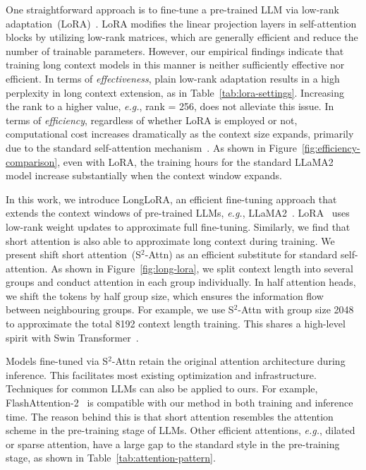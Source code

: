 \documentclass{article} %
\begin{document}
One straightforward approach is to fine-tune a pre-trained LLM via low-rank adaptation~(LoRA)~\citep{lora}. LoRA modifies the linear projection layers in self-attention blocks by utilizing low-rank matrices, which are generally efficient and reduce the number of trainable parameters. However, our empirical findings indicate that training long context models in this manner is neither sufficiently effective nor efficient.
In terms of \textit{effectiveness}, plain low-rank adaptation results in a high perplexity in long context extension, as in Table~\ref{tab:lora-settings}.
Increasing the rank to a higher value, \textit{e.g.}, rank = 256, does not alleviate this issue. %
In terms of \textit{efficiency}, regardless of whether LoRA is employed or not, computational cost increases dramatically as the context size expands, primarily due to the standard self-attention mechanism~\citep{attention}. As shown in Figure~\ref{fig:efficiency-comparison}, even with LoRA, the training hours for the standard LLaMA2 model increase substantially when the context window expands.

In this work, we introduce LongLoRA, an efficient fine-tuning approach that extends the context windows of pre-trained LLMs, \textit{e.g.}, LLaMA2~\citep{llama2}. LoRA~\citep{lora} uses low-rank weight updates to approximate full fine-tuning. Similarly, we find that short attention is also able to approximate long context during training. We present shift short attention~(S$^2$-Attn) as an efficient substitute for standard self-attention. As shown in Figure~\ref{fig:long-lora}, we split context length into several groups and conduct attention in each group individually.
In half attention heads, we shift the tokens by half group size, which ensures the information flow between neighbouring groups.
For example, we use S$^2$-Attn with group size 2048 to approximate the total 8192 context length training. This shares a high-level spirit with Swin Transformer~\citep{swin-transformer}.

Models fine-tuned via S$^2$-Attn retain the original attention architecture during inference. This facilitates most existing optimization and infrastructure. Techniques for common LLMs can also be applied to ours. For example, FlashAttention-2~\citep{flash-attention, flash-attention2} is compatible with our method in both training and inference time. The reason behind this is that short attention resembles the attention scheme in the pre-training stage of LLMs.
Other efficient attentions, \textit{e.g.}, dilated or sparse attention, have a large gap to the standard style in the pre-training stage, as shown in Table~\ref{tab:attention-pattern}.
\end{document}

